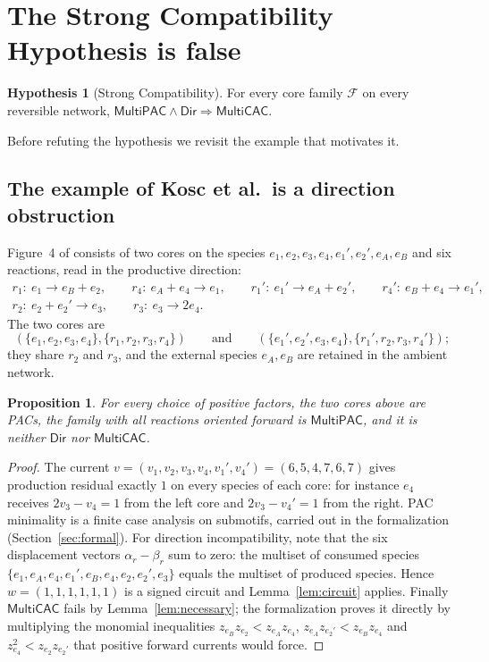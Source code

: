 \documentclass[11pt,a4paper]{article}
\theoremstyle{plain}
\newtheorem{proposition}[theorem]{Proposition}
\theoremstyle{definition}
\newtheorem{hypothesis}[theorem]{Hypothesis}
\theoremstyle{remark}
\newcommand{\cF}{\mathcal{F}}
\newcommand{\MPAC}{\mathsf{MultiPAC}}
\newcommand{\MCAC}{\mathsf{MultiCAC}}
\newcommand{\DIR}{\mathsf{Dir}}
\begin{document}
\section{The Strong Compatibility Hypothesis is false}\label{sec:sch}

\begin{hypothesis}[Strong Compatibility]\label{hyp:sch}
For every core family $\cF$ on every reversible network, $\MPAC\wedge\DIR\Rightarrow\MCAC$.
\end{hypothesis}

Before refuting the hypothesis we revisit the example that motivates it.

\subsection{The example of Kosc et al.\ is a direction obstruction}

Figure~4 of \citep{kosc2025} consists of two cores on the species $e_1,e_2,e_3,e_4,e_1',e_2',e_A,e_B$ and six reactions, read in the productive direction:
\begin{gather*}
 r_1:\ e_1\to e_B+e_2,\qquad r_4:\ e_A+e_4\to e_1,\qquad r_1':\ e_1'\to e_A+e_2',\qquad r_4':\ e_B+e_4\to e_1',\\
 r_2:\ e_2+e_2'\to e_3,\qquad r_3:\ e_3\to 2e_4 .
\end{gather*}
The two cores are
\[
 (\{e_1,e_2,e_3,e_4\},\{r_1,r_2,r_3,r_4\})\qquad\text{and}\qquad(\{e_1',e_2',e_3,e_4\},\{r_1',r_2,r_3,r_4'\});
\]
they share $r_2$ and $r_3$, and the external species $e_A,e_B$ are retained in the ambient network.

\begin{proposition}\label{prop:paperpair}
For every choice of positive factors, the two cores above are PACs, the family with all reactions oriented forward is $\MPAC$, and it is neither $\DIR$ nor $\MCAC$.
\end{proposition}

\begin{proof}
The current $v=(v_1,v_2,v_3,v_4,v_1',v_4')=(6,5,4,7,6,7)$ gives production residual exactly $1$ on every species of each core: for instance $e_4$ receives $2v_3-v_4=1$ from the left core and $2v_3-v_4'=1$ from the right. PAC minimality is a finite case analysis on submotifs, carried out in the formalization (Section~\ref{sec:formal}). For direction incompatibility, note that the six displacement vectors $\alpha_r-\beta_r$ sum to zero: the multiset of consumed species $\{e_1,e_A,e_4,e_1',e_B,e_4,e_2,e_2',e_3\}$ equals the multiset of produced species. Hence $w=(1,1,1,1,1,1)$ is a signed circuit and Lemma~\ref{lem:circuit} applies. Finally $\MCAC$ fails by Lemma~\ref{lem:necessary}; the formalization proves it directly by multiplying the monomial inequalities $z_{e_B}z_{e_2}<z_{e_A}z_{e_4}$, $z_{e_A}z_{e_2'}<z_{e_B}z_{e_4}$ and $z_{e_4}^2<z_{e_2}z_{e_2'}$ that positive forward currents would force.
\end{proof}
\end{document}
